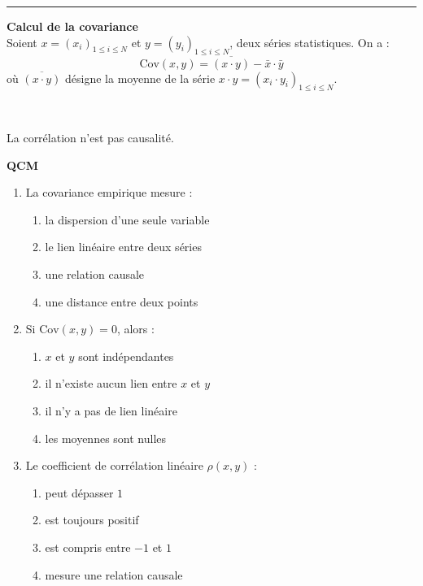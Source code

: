 \documentclass[../PolyS4.tex]{subfiles}
\begin{document}
\vspace{1em}
\hrule
\vspace{1em}

\begin{Prop}\textbf{Calcul de la covariance}\\

Soient $x = (x_i)_{1 \leq i \leq N}$ et $y = (y_i)_{1 \leq i \leq N}$, deux séries statistiques. On a :
\[
\text{Cov}(x, y) = \overline{(x \cdot y)} - \bar{x} \cdot \bar{y}
\]
où $\overline{(x \cdot y)}$ désigne la moyenne de la série $x \cdot y = (x_i \cdot y_i)_{1 \leq i \leq N}$.
\end{Prop}

\begin{Rmq}$\,$

La corrélation n'est pas causalité.
\end{Rmq}


\textbf{QCM}

\begin{enumerate}
\item La covariance empirique mesure :
\begin{enumerate}
\item la dispersion d'une seule variable
\item le lien linéaire entre deux séries
\item une relation causale
\item une distance entre deux points
\end{enumerate}

\item Si $\text{Cov}(x,y)=0$, alors :
\begin{enumerate}
\item $x$ et $y$ sont indépendantes
\item il n'existe aucun lien entre $x$ et $y$
\item il n'y a pas de lien linéaire
\item les moyennes sont nulles
\end{enumerate}

\item Le coefficient de corrélation linéaire $\rho(x,y)$ :
\begin{enumerate}
\item peut dépasser $1$
\item est toujours positif
\item est compris entre $-1$ et $1$
\item mesure une relation causale
\end{enumerate}
\end{enumerate}
\end{document}
